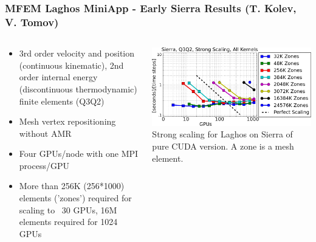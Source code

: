 \documentclass[aspectratio=169]{beamer}
\begin{document}
\begin{frame}
  \frametitle{MFEM Laghos MiniApp - Early Sierra Results (T. Kolev, V. Tomov)}
  \begin{columns}
    \begin{column}{0.5\textwidth}
      \begin{itemize}
        \item 3rd order velocity and position (continuous kinematic), 2nd order internal
          energy (discontinuous thermodynamic) finite elements (Q3Q2)
        \item Mesh vertex repositioning without AMR
        \item Four GPUs/node with one MPI process/GPU
        \item More than 256K (256*1000) elements ('zones') required for
          scaling to ~30 GPUs, 16M elements required for 1024 GPUs
      \end{itemize}
    \end{column}
    \begin{column}{0.5\textwidth}
      \includegraphics[width=\textwidth]{figures/laghos_strong_Q3Q2_sierra_cws.png} \\
      \small{Strong scaling for Laghos on Sierra of pure CUDA version.
      A zone is a mesh element.}
    \end{column}
  \end{columns}
\end{frame}
\end{document}
